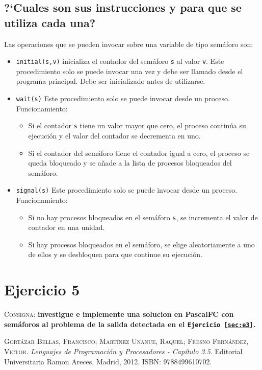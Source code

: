 \documentclass{article}
\begin{document}
\subsection{?`Cuales son sus instrucciones y para que se utiliza cada una?}
Las operaciones que se pueden invocar sobre una variable de tipo sem\'aforo son:
\begin{itemize}
\item \texttt{initial(s,v)} inicializa el contador del sem\'aforo \texttt{s} al valor \texttt{v}. Este procedimiento solo se puede invocar una vez y debe ser llamado desde el programa principal. Debe ser inicializado antes de utilizarse.
\item \texttt{wait(s)} Este procedimiento solo se puede invocar desde un proceso. Funcionamiento:
  \begin{itemize}
    \item Si el contador \texttt{s} tiene un valor mayor que cero, el proceso contin\'ua su ejecuci\'on y el valor del contador se decrementa en uno.
    \item Si el contador del sem\'aforo tiene el contador igual a cero, el proceso se queda bloqueado y se a\~{n}ade a la lista de procesos bloqueados del sem\'aforo.
  \end{itemize}
\item \texttt{signal(s)} Este procedimiento solo se puede invocar desde un proceso. Funcionamiento:
  \begin{itemize}
    \item Si no hay procesos bloqueados en el sem\'aforo \texttt{s}, se incrementa el valor de contador en una unidad.
    \item Si hay procesos bloqueados en el sem\'aforo, se elige aleatoriamente a uno de ellos y se desbloquea para que continue su ejecuci\'on.
  \end{itemize}
\end{itemize}



\section{Ejercicio 5}
\textsc{Consigna}: \textbf{investigue e implemente una solucion en PascalFC con sem\'aforos al problema de la salida detectada en el \texttt{Ejercicio \ref{sec:e3}}.}



\begin{thebibliography}{99}
	\textsc{Gort\'azar Bellas, Francisco; Mart\'inez Unanue, Raquel; Fresno Fern\'andez, Victor}. \textit{Lenguajes de Programaci\'on y Procesadores - Cap\'itulo 3.5}. Editorial Universitaria Ramon Areces, Madrid, 2012. \textsc{ISBN: 9788499610702}.
\end{thebibliography}
\end{document}
